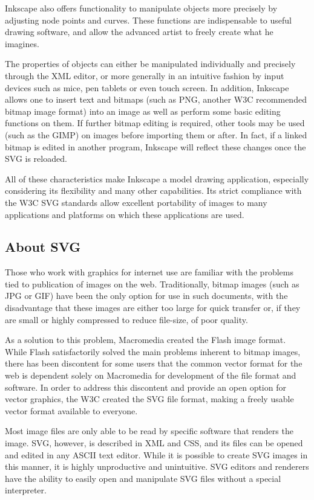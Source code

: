 Inkscape also offers functionality to manipulate objects more precisely by adjusting node points and curves.
These functions are indispensable to useful drawing software, and allow the advanced artist to freely create
what he imagines.

The properties of objects can either be manipulated individually and precisely through the XML editor, or
more generally in an intuitive fashion by input devices such as mice, pen tablets or even touch screen.
In addition, Inkscape allows one to insert text and bitmaps (such as PNG, another W3C recommended bitmap
image format) into an image as well as perform some basic editing functions on them. If further bitmap
editing is required, other tools may be used (such as the GIMP) on images before importing them or after. In
fact, if a linked bitmap is edited in another program, Inkscape will reflect these changes once the SVG is
reloaded.

All of these characteristics make Inkscape a model drawing application, especially considering its flexibility
and many other capabilities. Its strict compliance with the W3C SVG standards allow excellent portability of
images to many applications and platforms on which these applications are used.

\subsection{About SVG}
Those who work with graphics for internet use are familiar with the problems tied to publication of images on
the web. Traditionally, bitmap images (such as JPG or GIF) have been the only option for use in such
documents, with the disadvantage that these images are either too large for quick transfer or, if they are small
or highly compressed to reduce file-size, of poor quality.

As a solution to this problem, Macromedia created the Flash image format. While Flash satisfactorily solved
the main problems inherent to bitmap images, there has been discontent for some users that the common
vector format for the web is dependent solely on Macromedia for development of the file format and
software. In order to address this discontent and provide an open option for vector graphics, the W3C created
the SVG file format, making a freely usable vector format available to everyone.

Most image files are only able to be read by specific software that renders the image. SVG, however, is
described in XML and CSS, and its files can be opened and edited in any ASCII text editor. While it is
possible to create SVG images in this manner, it is highly unproductive and unintuitive. SVG editors and
renderers have the ability to easily open and manipulate SVG files without a special interpreter.

